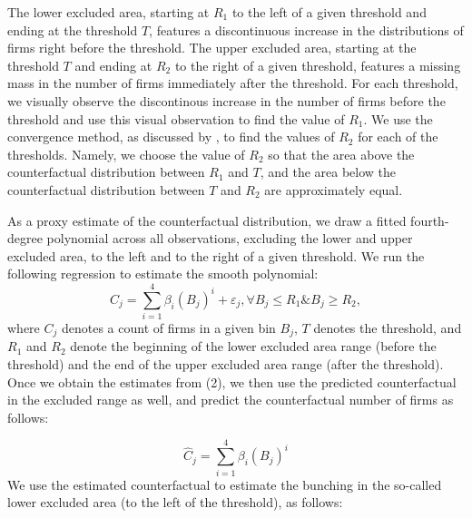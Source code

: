 The lower excluded area, starting at $R_{1}$ to the left of a given
threshold and ending at the threshold $T$, features a discontinuous
increase in the distributions of firms right before the threshold.
The upper excluded area, starting at the threshold $T$ and ending
at $R_{2}$ to the right of a given threshold, features a missing
mass in the number of firms immediately after the threshold. For each
threshold, we visually observe the discontinous increase in the number
of firms before the threshold and use this visual observation to find
the value of $R_{1}$. We use the convergence method, as discussed
by \citet{kleven2013using}, to find the values of $R_{2}$ for each
of the thresholds. Namely, we choose the value of $R_{2}$ so that
the area above the counterfactual distribution between $R_{1}$ and
$T$, and the area below the counterfactual distribution between $T$
and $R_{2}$ are approximately equal.

As a proxy estimate of the counterfactual distribution, we draw a
fitted fourth-degree polynomial across all observations, excluding
the lower and upper excluded area, to the left and to the right of
a given threshold. We run the following regression to estimate the
smooth polynomial: 
\begin{equation}
C_{j}=\sum_{i=1}^{4}\beta_{i}(B_{j})^{i}+\varepsilon_{j},\forall B_{j}\leq R_{1}\&B_{j}\geq R_{2},
\end{equation}
where $C_{j}$ denotes a count of firms in a given bin $B_{j}$, $T$
denotes the threshold, and $R_{1}$ and $R_{2}$ denote the beginning
of the lower excluded area range (before the threshold) and the end
of the upper excluded area range (after the threshold). Once we obtain
the estimates from (2), we then use the predicted counterfactual in
the excluded range as well, and predict the counterfactual number
of firms as follows:

\[
\hat{C}_{j}=\sum_{i=1}^{4}\beta_{i}(B_{j})^{i}
\]
We use the estimated counterfactual to estimate the bunching in the
so-called lower excluded area (to the left of the threshold), as follows:

